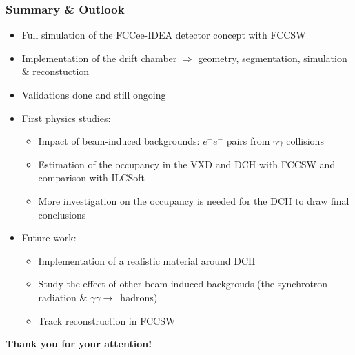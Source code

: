 \documentclass[aspectratio=169, hyperref={colorlinks=true,pdfpagelabels=false,linkcolor=black}, xcolor=dvipsnames,10pt]{beamer}
\begin{document}
\begin{frame}
\begin{columns}
	\end{columns}
	
\end{frame}

\label{lastslide}
\begin{frame}
  \frametitle{Summary \& Outlook}
  
  	\vspace{1cm}
	\begin{itemize}
	\item Full simulation of the FCCee-IDEA detector concept with FCCSW
	\item Implementation of the drift chamber 
		$\Rightarrow$ geometry, segmentation, simulation \& reconstuction
	\item Validations done and still ongoing 
	\item First physics studies:
		\begin{itemize}
		\item Impact of beam-induced backgrounds: $e^{+}e^{-}$ pairs from $\gamma\gamma$ collisions
	  	\item Estimation of the occupancy in the VXD and DCH with FCCSW and comparison with ILCSoft
	  	\item More investigation on the occupancy is needed for the DCH to draw final conclusions
	  	\end{itemize}
	\item Future work:
		\begin{itemize}
		\item Implementation of a realistic material around DCH 
		\item Study the effect of other beam-induced
                  backgrouds (the synchrotron radiation \& $\gamma\gamma\rightarrow$~hadrons)
		\item Track reconstruction in FCCSW
		\end{itemize}
  	\end{itemize}

	\vspace{1cm}
	\centering
	\Large{\textbf{Thank you for your attention!}}
\end{frame}
\end{document}
